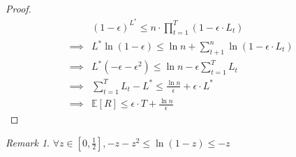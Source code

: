 \documentclass[11pt]{article}
\theoremstyle{definition}
\theoremstyle{remark}
\newtheorem*{remark}{Remark}
\begin{document}
\begin{proof}
\begin{align*}
& (1-\epsilon)^{L^*} \leq n \cdot \prod_{t=1}^{T} (1 - \epsilon \cdot L_t) \\ 
\implies & L^* \ln (1-\epsilon) \leq \ln n + \sum _{t+1}^n \ln (1 - \epsilon \cdot L_t) \\
\implies & L^* (-\epsilon-\epsilon^2) \leq \ln n - \epsilon \sum_{t=1}^T L_t \\
\implies & \sum_{t=1}^T L_t - L^* \leq \frac{\ln n}{\epsilon} + \epsilon \cdot L^* \\
\implies & \mathbb{E}[R] \leq \epsilon \cdot T + \frac{\ln n}{\epsilon}
\end{align*}
\end{proof}


\begin{remark} $\forall z \in [0,\frac{1}{2}], -z-z^2 \leq \ln (1-z) \leq -z$
\end{remark}
\end{document}
